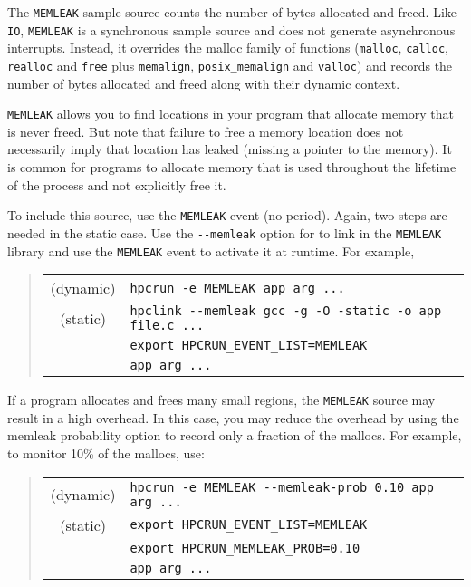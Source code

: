 The \verb|MEMLEAK| sample source counts the number of bytes allocated
and freed.  Like \verb|IO|, \verb|MEMLEAK| is a synchronous sample
source and does not generate asynchronous interrupts.  Instead, it
overrides the malloc family of functions (\verb|malloc|, \verb|calloc|,
\verb|realloc| and \verb|free| plus \verb|memalign|, \verb|posix_memalign|
and \verb|valloc|) and records the number of bytes
allocated and freed along with their dynamic context.

\verb|MEMLEAK| allows you to find locations in your program that
allocate memory that is never freed.  But note that failure to free a
memory location does not necessarily imply that location has leaked
(missing a pointer to the memory).  It is common for programs to
allocate memory that is used throughout the lifetime of the process
and not explicitly free it.

To include this source, use the \verb|MEMLEAK| event (no period).
Again, two steps are needed in the static case.  Use the \verb|--memleak|
option for \hpclink{} to link in the \verb|MEMLEAK| library
and use the \verb|MEMLEAK| event to activate it at runtime.  For
example,

\begin{quote}
\begin{tabular}{@{}cl}
(dynamic) & \verb|hpcrun -e MEMLEAK app arg ...| \\
(static)  & \verb|hpclink --memleak gcc -g -O -static -o app file.c ...| \\
& \verb|export HPCRUN_EVENT_LIST=MEMLEAK| \\
& \verb|app arg ...|
\end{tabular}
\end{quote}

If a program allocates and frees many small regions, the \verb|MEMLEAK|
source may result in a high overhead.  In this case, you may reduce
the overhead by using the memleak probability option to record only a
fraction of the mallocs.  For example, to monitor 10\% of the mallocs,
use:

\begin{quote}
\begin{tabular}{@{}cl}
(dynamic) & \verb|hpcrun -e MEMLEAK --memleak-prob 0.10 app arg ...| \\
(static)  & \verb|export HPCRUN_EVENT_LIST=MEMLEAK| \\
& \verb|export HPCRUN_MEMLEAK_PROB=0.10| \\
& \verb|app arg ...|
\end{tabular}
\end{quote}

